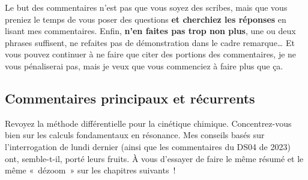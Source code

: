 \documentclass[a4paper, 10pt, final, garamond]{book}
\begin{document}
Le but des commentaires n'est pas que vous soyez des scribes, mais que vous
preniez le temps de vous poser des questions \textbf{et cherchiez les réponses}
en lisant mes commentaires.
\smallbreak
Enfin, \textbf{n'en faites pas trop non plus}, une ou deux phrases suffisent, ne
refaites pas de démonstration dans le cadre remarque… Et vous pouvez continuer à
ne faire que citer des portions des commentaires, je ne vous pénaliserai pas,
mais je veux que vous commenciez à faire plus que ça.

\subsection{Commentaires principaux et récurrents}
Revoyez la méthode différentielle pour la cinétique chimique. Concentrez-vous
bien sur les calculs fondamentaux en résonance. Mes conseils basés sur
l'interrogation de lundi dernier (ainsi que les commentaires du DS04 de 2023)
ont, semble-t-il, porté leurs fruits. À vous d'essayer de faire le même résumé
et le même «~dézoom~» sur les chapitres suivants~!

\setcounter{section}{0}
\end{document}
